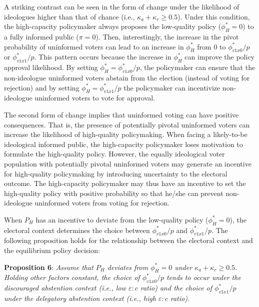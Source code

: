 \documentclass[doc,natbib,12pt]{apa6}
\begin{document}
	\par A striking contrast can be seen in the form of change under the likelihood of ideologues higher than that of chance (i.e., $\kappa_{a} + \kappa_{r} \geq 0.5$). Under this condition, the high-capacity policymaker always proposes the low-quality policy ($\phi^*_H=0$) to a fully informed public ($\pi=0$). Then, interestingly, the increase in the pivot probability of uninformed voters can lead to an increase in $\phi^*_H$ from $0$ to $\phi^*_{v1x0}/p$ or $\phi^*_{v1x1}/p$. This pattern occurs because the increase in $\phi^*_H$ can improve the policy approval likelihood. By setting $\phi^*_H=\phi^*_{v1x0}/p$, the policymaker can ensure that the non-ideologue uninformed voters abstain from the election (instead of voting for rejection) and by setting $\phi^*_H=\phi^*_{v1x1}/p$ the policymaker can incentivize non-ideologue uninformed voters to vote for approval.
	
	\par The second form of change implies that uninformed voting can have positive consequences. That is, the presence of potentially pivotal uninformed voters can increase the likelihood of high-quality policymaking. When facing a likely-to-be ideological informed public, the high-capacity policymaker loses motivation to formulate the high-quality policy. However, the equally ideological voter population with potentially pivotal uninformed voters may generate an incentive for high-quality policymaking by introducing uncertainty to the electoral outcome. The high-capacity policymaker may thus have an incentive to set the high-quality policy with positive probability so that he/she can prevent non-ideologue uninformed voters from voting for rejection. 
	
	\par When $P_H$ has an incentive to deviate from the low-quality policy ($\phi^*_H=0$), the electoral context determines the choice between $\phi^*_{v1x0}/p$ and $\phi^*_{v1x1}/p$. The following proposition holds for the relationship between the electoral context and the equilibrium policy decision:
	
	\noindent \textbf{Proposition 6}: \textit{Assume that $P_H$ deviates from $\phi^*_H=0$ under $\kappa_a+\kappa_r\geq0.5$. Holding other factors constant, the choice of $\phi^*_{v1x0}/p$ tends to occur under the discouraged abstention context (i.e., low $\varepsilon:c$ ratio) and the choice of $\phi^*_{v1x1}/p$ under the delegatory abstention context (i.e., high $\varepsilon:c$ ratio).}
	
\end{document}

